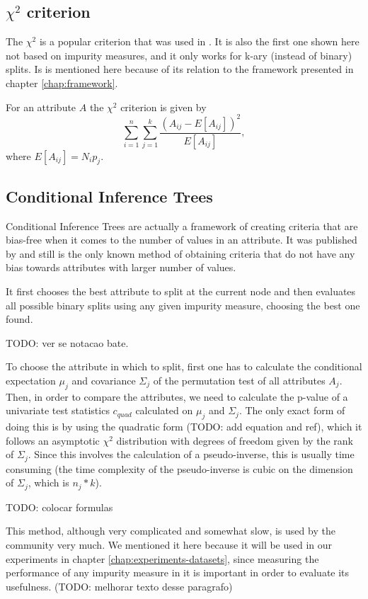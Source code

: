 \subsection{$\chi^2$ criterion}
The $\chi^2$ is a popular criterion that was  used in \cite{Mingers.87}. It is also the first one shown here not based on impurity measures, and it only works for k-ary (instead of binary) splits. Is is mentioned here because of its relation to the framework presented in chapter \ref{chap:framework}.

For an attribute $A$ the $\chi^2$ criterion is given by 
\begin{equation}
\label{eq:chitest}
\sum_{i=1}^n \sum_{j=1}^k \frac{(A_{ij}-E[A_{ij}] )^2}{E[A_{ij}]},
\end{equation}
where $E[A_{ij}]=N_i p_j$.

\subsection{Conditional Inference Trees}
Conditional Inference Trees are actually a framework of creating criteria that are bias-free when it comes to the number of values in an attribute. It was published by \cite{Hawthorn} and still is the only known method of obtaining criteria that do not have any bias towards attributes with larger number of values.

It first chooses the best attribute to split at the current node and then evaluates all possible binary splits using any given impurity measure, choosing the best one found.

TODO: ver se notacao bate.

To choose the attribute in which to split, first one has to calculate the conditional expectation $\mu_j$ and covariance $\Sigma_j$ of the permutation test of all attributes $A_j$. Then, in order to compare the attributes, we need to calculate the p-value of a univariate test statistics $c_{quad}$ calculated on $\mu_j$ and $\Sigma_j$. The only exact form of doing this is by using the quadratic form (TODO: add equation and ref), which it follows an asymptotic $\chi^2$ distribution with degrees of freedom given by the rank of $\Sigma_j$. Since this involves the calculation of a pseudo-inverse, this is usually time consuming (the time complexity of the pseudo-inverse is cubic on the dimension of $\Sigma_j$, which is $n_j * k$).

TODO: colocar formulas

This method, although very complicated and somewhat slow, is used by the community very much. We mentioned it here because it will be used in our experiments in chapter \ref{chap:experiments-datasets}, since measuring the performance of any impurity measure in it is important in order to evaluate its usefulness. (TODO: melhorar texto desse paragrafo)




